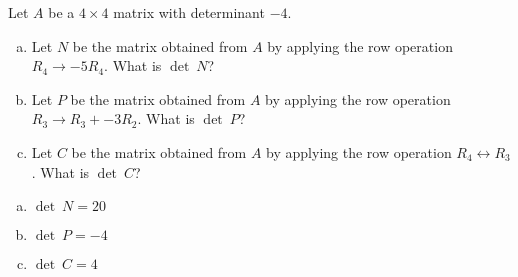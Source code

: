 
\begin{exerciseStatement}


Let \(A\) be a \(4 \times 4\) matrix with determinant \( -4 \).


\begin{enumerate}[(a)]
\item Let \(N\) be the matrix obtained from \(A\) by applying the row operation \( R_4 \to -5R_4 \). What is \(\operatorname{det}\ N\)?
\item Let \(P\) be the matrix obtained from \(A\) by applying the row operation \( R_3 \to R_3 + -3R_2 \). What is \(\operatorname{det}\ P\)?
\item Let \(C\) be the matrix obtained from \(A\) by applying the row operation \( R_4 \leftrightarrow R_3 \). What is \(\operatorname{det}\ C\)?
\end{enumerate}
    
\end{exerciseStatement}
    
\begin{exerciseAnswer} 

\begin{enumerate}[(a)]
\item \(\operatorname{det}\ N= 20 \)
\item \(\operatorname{det}\ P= -4 \)
\item \(\operatorname{det}\ C= 4 \)
\end{enumerate}
    
\end{exerciseAnswer}
    

